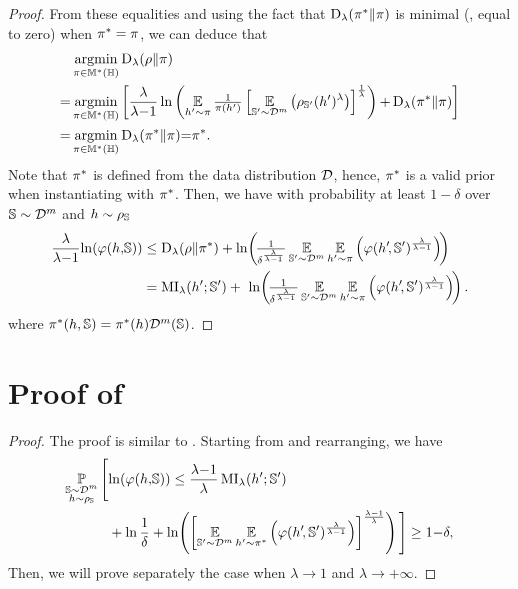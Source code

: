 \begin{noaddcontents}
\begin{proof}
From these equalities and using the fact that $\Renyi_{\lambda}(\P^*\| \P)$ is minimal (\ie, equal to zero) when $\P^*=\P$, we can deduce that
\begin{align*}
    &\argmin_{\P\in\M^{*}(\H)}\Renyi_{\lambda}(\rho\|\pi)\\
    {=} &\argmin_{\P\in\M^{*}(\H)} \LB\frac{\lambda}{\lambda{-}1}\ln\LP\EE_{\h'{\sim}\P}\tfrac{1}{\P(\h')}\LB\EE_{\S'{\sim}\D^{\m}}\LP\AQp (\h')^{\lambda}\RP\RB^{\frac{1}{\lambda}}\RP{+} \Renyi_{\lambda}(\P^{*}\| \P)\RB\\
    {=}&\argmin_{\P\in\M^{*}(\H)}\Renyi_{\lambda}(\P^{*}\| \P){=}\P^*.
\end{align*}
Note that $\P^*$ is defined from the data distribution $\D$, hence, $\P^*$ is a valid prior when instantiating  with $\P^*$.
Then, we have with probability at least $1{-}\delta$ over $\S\sim\D^\m$ and $\h\sim\AQ$
\begin{align*}
    \frac{\lambda}{\lambda{-}1}\!\ln\!\LP\varphi(\h,\!\S)\RP &\le \Renyi_{\lambda}(\rho\|\pi^*) + \ln\!\LP\!\tfrac{1}{\delta^{\frac{\lambda}{\lambda{-}1}}}\EE_{\S'{\sim}\D^{\m}}\EE_{\h'{\sim} \P}\LP\varphi(\h'\!, \S')^{\frac{\lambda}{\lambda-1}}\RP\!\RP\\
    &= \MI_{\lambda}(\h'; \S') +\ \ln\!\LP\!\tfrac{1}{\delta^{\frac{\lambda}{\lambda{-}1}}}\EE_{\S'{\sim}\D^{\m}}\EE_{\h'{\sim} \P}\LP\varphi(\h'\!, \S')^{\frac{\lambda}{\lambda-1}}\RP\!\RP.
\end{align*}
where $\pi^*(\h, \S)=\P^*(\h)\D^{\m}(\S)$.
\end{proof}

\section{Proof of }

\corollarymutualinfo*
\begin{proof} 
The proof is similar to .
Starting from  and rearranging, we have
\begin{align*}
    \PP_{\substack{\S\sim\D^{\m}\\ h\sim \AQ}}\Bigg[ &\!\ln\!\LP\varphi(\h,\!\S)\RP \le  \frac{\lambda{-}1}{\lambda}\MI_{\lambda}(\h'; \S')\\ 
    &+\ln\frac{1}{\delta} + \ln\!\LP\LB\EE_{\S'{\sim}\D^{\m}}\EE_{\h'{\sim} \P^*}\LP\varphi(\h'\!, \S')^{\frac{\lambda}{\lambda-1}}\RP\RB^{\frac{\lambda{-}1}{\lambda}}\RP \Bigg]\ge 1{-}\delta,
\end{align*}
Then, we will prove separately the case when $\lambda\rightarrow 1$ and $\lambda\rightarrow +\infty$.


\end{proof}
\end{noaddcontents}
